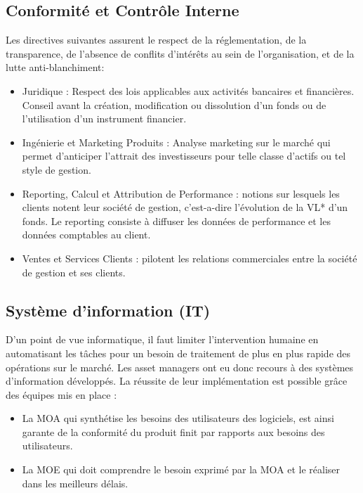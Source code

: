 \subsection{Conformité et Contrôle Interne} 
Les directives suivantes assurent le respect de la réglementation, de la transparence, de l’absence de conflits d’intérêts au sein de l’organisation, et de la lutte anti-blanchiment:
\begin{itemize}
    \item Juridique : Respect des lois applicables aux activités bancaires et financières. Conseil avant la création, modification ou dissolution d’un fonds ou de l’utilisation d’un instrument financier.  
    \item Ingénierie et Marketing Produits : Analyse marketing sur le marché qui permet d’anticiper l’attrait des investisseurs pour telle classe d’actifs ou tel style de gestion.  
    \item Reporting, Calcul et Attribution de Performance : notions sur lesquels les clients notent leur société de gestion, c’est-a-dire l’évolution de la VL* d’un fonds. Le reporting consiste à diffuser les données de performance et les données comptables au client.  
    \item Ventes et Services Clients : pilotent les relations commerciales entre la société de gestion et ses clients.
\end{itemize}


\subsection{Système d’information (IT)} 
\par D’un point de vue informatique, il faut limiter l’intervention humaine en automatisant les tâches pour un besoin de traitement de plus en plus rapide des opérations sur le marché. Les asset managers ont eu donc recours à des systèmes d’information développés. La réussite de leur implémentation est possible grâce des équipes mis en place : 
\begin{itemize}
    \item La MOA qui synthétise les besoins des utilisateurs des logiciels, est ainsi garante de la conformité du produit finit par rapports aux besoins des utilisateurs.  
    \item La MOE  qui doit comprendre le besoin exprimé par la MOA et le réaliser dans les meilleurs délais.
\end{itemize} 
 
